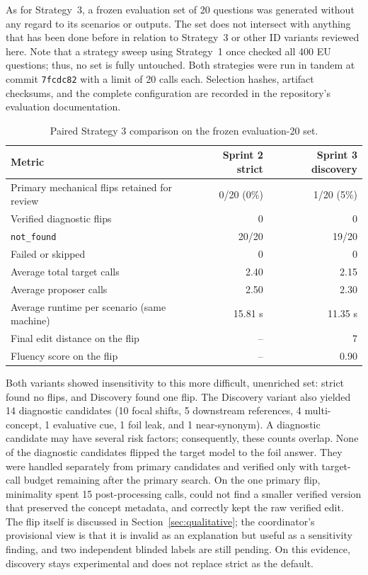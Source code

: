 \documentclass[11pt,a4paper]{article}
\begin{document}
As for Strategy~3, a frozen evaluation set of 20 questions was generated without any
regard to its scenarios or outputs. The set does not intersect with anything that has
been done before in relation to Strategy~3 or other ID variants reviewed here. Note
that a strategy sweep using Strategy~1 once checked all 400 EU questions; thus, no set
is fully untouched. Both strategies were run in tandem at commit \texttt{7fcdc82} with
a limit of 20 calls each. Selection hashes, artifact checksums, and
the complete configuration are recorded in the repository's evaluation documentation.

\begin{table}[htbp]
\centering
\small
\begin{tabularx}{\textwidth}{@{}Y r r@{}}
\toprule
\textbf{Metric} & \textbf{Sprint 2 strict} & \textbf{Sprint 3 discovery} \\
\midrule
Primary mechanical flips retained for review & 0/20 (0\%) & 1/20 (5\%) \\
Verified diagnostic flips & 0 & 0 \\
\texttt{not\_found} & 20/20 & 19/20 \\
Failed or skipped & 0 & 0 \\
Average total target calls & 2.40 & 2.15 \\
Average proposer calls & 2.50 & 2.30 \\
Average runtime per scenario (same machine) & 15.81 s & 11.35 s \\
Final edit distance on the flip & -- & 7 \\
Fluency score on the flip & -- & 0.90 \\
\bottomrule
\end{tabularx}
\caption{Paired Strategy 3 comparison on the frozen evaluation-20 set.}
\label{tab:s3}
\end{table}

Both variants showed insensitivity to this more difficult, unenriched set: strict
found no flips, and Discovery found one flip. The Discovery variant also yielded 14
diagnostic candidates (10 focal shifts, 5 downstream references, 4 multi-concept, 1
evaluative cue, 1 foil leak, and 1 near-synonym). A diagnostic candidate may have
several risk factors; consequently, these counts overlap. None of the diagnostic
candidates flipped the target model to the foil answer. They were handled separately
from primary candidates and verified only with target-call budget remaining after the
primary search. On the one primary flip, minimality spent 15 post-processing calls,
could not
find a smaller verified version that preserved the concept metadata, and correctly
kept the raw verified edit. The flip itself is discussed in
Section~\ref{sec:qualitative}; the coordinator's provisional view is that it is
invalid as an explanation but useful as a sensitivity finding, and two independent
blinded labels are still pending. On this evidence, discovery stays experimental and
does not replace strict as the default.
\end{document}
